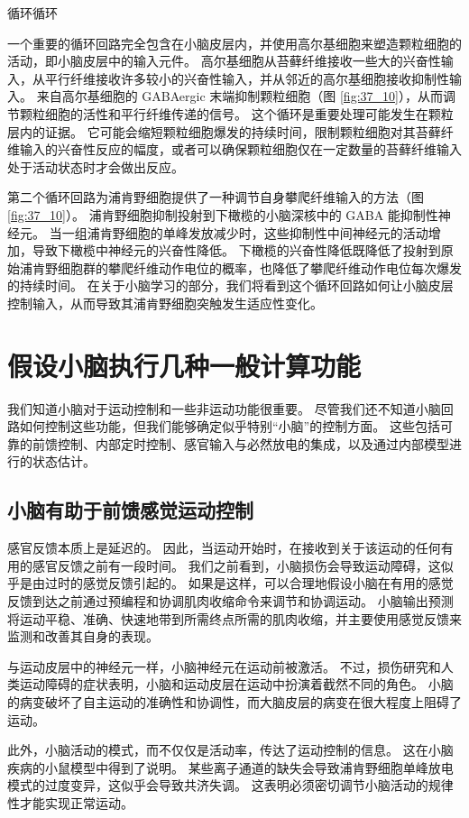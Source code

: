 循环循环

一个重要的循环回路完全包含在小脑皮层内，并使用高尔基细胞来塑造颗粒细胞的活动，即小脑皮层中的输入元件。 高尔基细胞从苔藓纤维接收一些大的兴奋性输入，从平行纤维接收许多较小的兴奋性输入，并从邻近的高尔基细胞接收抑制性输入。 来自高尔基细胞的 GABAergic 末端抑制颗粒细胞（图 \ref{fig:37_10}），从而调节颗粒细胞的活性和平行纤维传递的信号。 这个循环是重要处理可能发生在颗粒层内的证据。 它可能会缩短颗粒细胞爆发的持续时间，限制颗粒细胞对其苔藓纤维输入的兴奋性反应的幅度，或者可以确保颗粒细胞仅在一定数量的苔藓纤维输入处于活动状态时才会做出反应。

第二个循环回路为浦肯野细胞提供了一种调节自身攀爬纤维输入的方法（图 \ref{fig:37_10}）。 浦肯野细胞抑制投射到下橄榄的小脑深核中的 GABA 能抑制性神经元。 当一组浦肯野细胞的单峰发放减少时，这些抑制性中间神经元的活动增加，导致下橄榄中神经元的兴奋性降低。 下橄榄的兴奋性降低既降低了投射到原始浦肯野细胞群的攀爬纤维动作电位的概率，也降低了攀爬纤维动作电位每次爆发的持续时间。 在关于小脑学习的部分，我们将看到这个循环回路如何让小脑皮层控制输入，从而导致其浦肯野细胞突触发生适应性变化。


\section{假设小脑执行几种一般计算功能}
我们知道小脑对于运动控制和一些非运动功能很重要。 尽管我们还不知道小脑回路如何控制这些功能，但我们能够确定似乎特别“小脑”的控制方面。 这些包括可靠的前馈控制、内部定时控制、感官输入与必然放电的集成，以及通过内部模型进行的状态估计。

\subsection{小脑有助于前馈感觉运动控制}
感官反馈本质上是延迟的。 因此，当运动开始时，在接收到关于该运动的任何有用的感官反馈之前有一段时间。 我们之前看到，小脑损伤会导致运动障碍，这似乎是由过时的感觉反馈引起的。 如果是这样，可以合理地假设小脑在有用的感觉反馈到达之前通过预编程和协调肌肉收缩命令来调节和协调运动。 小脑输出预测将运动平稳、准确、快速地带到所需终点所需的肌肉收缩，并主要使用感觉反馈来监测和改善其自身的表现。

与运动皮层中的神经元一样，小脑神经元在运动前被激活。 不过，损伤研究和人类运动障碍的症状表明，小脑和运动皮层在运动中扮演着截然不同的角色。 小脑的病变破坏了自主运动的准确性和协调性，而大脑皮层的病变在很大程度上阻碍了运动。

此外，小脑活动的模式，而不仅仅是活动率，传达了运动控制的信息。 这在小脑疾病的小鼠模型中得到了说明。 某些离子通道的缺失会导致浦肯野细胞单峰放电模式的过度变异，这似乎会导致共济失调。 这表明必须密切调节小脑活动的规律性才能实现正常运动。

